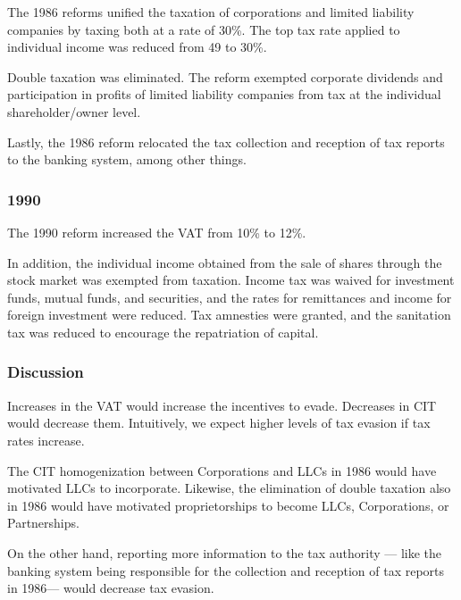 \documentclass[
  12pt]{article}
\theoremstyle{definition}
\theoremstyle{remark}
\begin{document}
The 1986 reforms unified the taxation of corporations and limited
liability companies by taxing both at a rate of 30\%. The top tax rate
applied to individual income was reduced from 49 to 30\%.

Double taxation was eliminated. The reform exempted corporate dividends
and participation in profits of limited liability companies from tax at
the individual shareholder/owner level.

Lastly, the 1986 reform relocated the tax collection and reception of
tax reports to the banking system, among other things.

\subsubsection{1990}\label{section-2}

The 1990 reform increased the VAT from 10\% to 12\%.

In addition, the individual income obtained from the sale of shares
through the stock market was exempted from taxation. Income tax was
waived for investment funds, mutual funds, and securities, and the rates
for remittances and income for foreign investment were reduced. Tax
amnesties were granted, and the sanitation tax was reduced to encourage
the repatriation of capital.

\subsubsection{Discussion}\label{discussion-2}

Increases in the VAT would increase the incentives to evade. Decreases
in CIT would decrease them. Intuitively, we expect higher levels of tax
evasion if tax rates increase.

The CIT homogenization between Corporations and LLCs in 1986 would have
motivated LLCs to incorporate. Likewise, the elimination of double
taxation also in 1986 would have motivated proprietorships to become
LLCs, Corporations, or Partnerships.

On the other hand, reporting more information to the tax authority ---
like the banking system being responsible for the collection and
reception of tax reports in 1986--- would decrease tax evasion.
\end{document}
